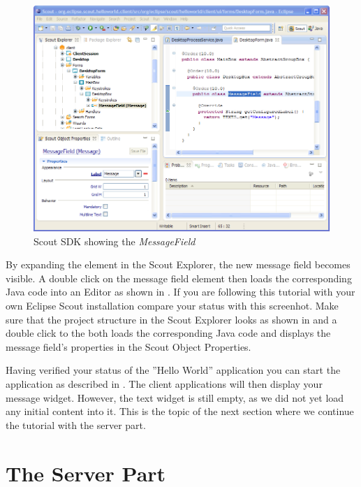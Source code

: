 \documentclass[a4paper,10pt,twoside]{book}
\begin{document}
\begin{figure}
\includegraphics[width=14cm]{sdk_helloworld_messagefield.png}
\caption{Scout SDK showing the \it{MessageField}}
\end{figure}

By expanding the  element in the Scout Explorer, the new message field becomes visible. 
A double click on the message field element then loads the corresponding Java code into an Editor as shown in .
If you are following this tutorial with your own Eclipse Scout installation compare your status with this screenhot.
Make sure that the project structure in the Scout Explorer looks as shown in  and a double click to the  both loads the corresponding Java code and displays the message field's properties in the Scout Object Properties.

Having verified your status of the ''Hello World'' application you can start the application as described in .
The client applications will then display your message widget.
However, the text widget is still empty, as we did not yet load any initial content into it.
This is the topic of the next section where we continue the tutorial with the server part.

\section{The Server Part}
\end{document}
